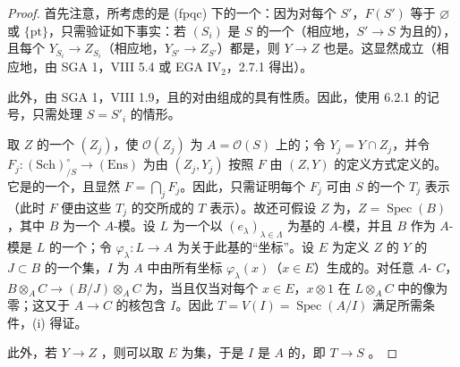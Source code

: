 \begin{proof}
首先注意，所考虑的是 (fpqc) 下的一个：因为对每个 $S'$，$F(S')$ 等于 $\varnothing$ 或 $\{\mathrm{pt}\}$，只需验证如下事实：若 $(S_i)$ 是 $S$ 的一个（相应地，$S'\to S$ 为且的），且每个 $Y_{S_i}\to Z_{S_i}$（相应地，$Y_{S'}\to Z_{S'}$）都是，则 $Y\to Z$ 也是。这显然成立（相应地，由 SGA 1，VIII 5.4 或 EGA $\mathrm{IV}_2$，2.7.1 得出）。

此外，由 SGA 1，VIII 1.9，且的对由组成的具有性质。因此，使用 6.2.1 的记号，只需处理 $S=S'_i$ 的情形。

取 $Z$ 的一个 $(Z_j)$，使 $\mathscr O(Z_j)$ 为 $A=\mathscr O(S)$ 上的；令 $Y_j=Y\cap Z_j$，并令 $F_j:(\mathrm{Sch})^\circ_{/S}\to(\mathrm{Ens})$ 为由 $(Z_j,Y_j)$ 按照 $F$ 由 $(Z,Y)$ 的定义方式定义的。它是的一个，且显然 $F=\bigcap_jF_j$。因此，只需证明每个 $F_j$ 可由 $S$ 的一个 $T_j$ 表示（此时 $F$ 便由这些 $T_j$ 的交所成的 $T$ 表示）。故还可假设 $Z$ 为，$Z=\operatorname{Spec}(B)$，其中 $B$ 为一个 $A$-模。设 $L$ 为一个以 $(e_\lambda)_{\lambda\in\Lambda}$ 为基的 $A$-模，并且 $B$ 作为 $A$-模是 $L$ 的一个；令 $\varphi_\lambda:L\to A$ 为关于此基的“坐标”。设 $E$ 为定义 $Z$ 的 $Y$ 的 $J\subset B$ 的一个集，$I$ 为 $A$ 中由所有坐标 $\varphi_\lambda(x)$（$x\in E$）生成的。对任意 $A$- $C$， $B\otimes_A C\to(B/J)\otimes_A C$ 为，当且仅当对每个 $x\in E$，$x\otimes1$ 在 $L\otimes_A C$ 中的像为零；这又于 $A\to C$ 的核包含 $I$。因此 $T=V(I)=\operatorname{Spec}(A/I)$ 满足所需条件，(i) 得证。

此外，若 $Y\to Z$ ，则可以取 $E$ 为集，于是 $I$ 是 $A$ 的，即 $T\to S$ 。
\end{proof}

